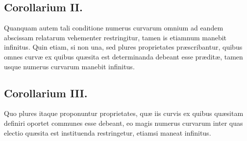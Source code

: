 \subsection*{Corollarium II.}
Quanquam autem tali conditione numerus curvarum omnium
ad eandem abscissam relatarum vehementer restringitur, tamen is etiamnum
manebit infinitus. Quin etiam, si non una, sed plures proprietates
præscribantur, quibus omnes curvæ ex quibus quæsita est determinanda debeant
esse præditæ, tamen usque numerus curvarum manebit infinitus.

\subsection*{Corollarium III.}
Quo plures itaque proponuntur proprietates, quæ iis
curvis ex quibus quæsitam definiri oportet communes esse debeant, eo magis
numerus curvarum inter quas electio quæsita est instituenda restringetur,
etiamsi maneat infinitus.

